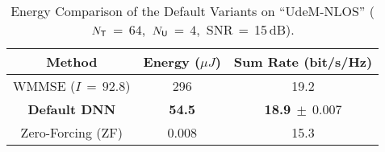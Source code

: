 \begin{table}[t]
    \centering
    \caption{Energy Comparison of the Default Variants on ``U\lowercase{de}M-NLOS''  ($N_{\sf{T}}$\,$=$\,$64$,~$N_{\sf{U}}$\,$=$\,$4$,~SNR\,$=$\,15\,dB).}
    \begin{tabular}{ccc}
        \toprule
        \textbf{Method} & \textbf{Energy ($\mu J$)} & \textbf{Sum Rate} (bit/s/Hz) \\
        \midrule
        WMMSE ($I$\,$=$\,$92.8$) & 296 & 19.2\phantom{$~\pm~0.007$}\\
        \textbf{Default DNN} & \textbf{54.5} & \textbf{18.9}$~\pm~0.007$\\
        Zero-Forcing (ZF) & 0.008  & 15.3\phantom{$~\pm~0.007$}\\
        \bottomrule
    \end{tabular}
    \label{table:energy_comparison}
\end{table}